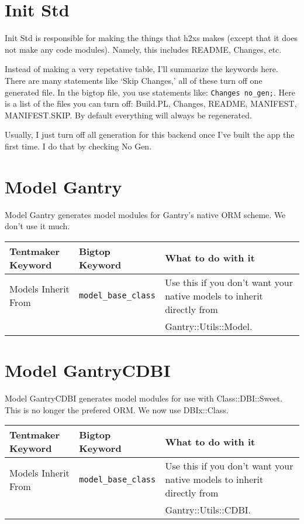 \section{Init Std}

Init Std is responsible for making the things that h2xs makes (except that
it does not make any code modules).  Namely, this includes README, Changes,
etc.

Instead of making a very repetative table, I'll summarize the keywords here.
There are many statements like `Skip Changes,' all of these turn off
one generated file.  In the bigtop file, you use statements like:
\verb+Changes no_gen;+.  Here is a list of the files you can turn off:
Build.PL, Changes, README, MANIFEST, MANIFEST.SKIP.  By default everything
will always be regenerated.

Usually, I just turn off all generation for this backend once I've built
the app the first time.  I do that by checking No Gen.

\section{Model Gantry}

Model Gantry generates model modules for Gantry's native ORM scheme.
We don't use it much.

\begin{tabular}{l|l|l}
Tentmaker Keyword & Bigtop Keyword & What to do with it \\
\hline
Models Inherit From & \verb+model_base_class+ &
    Use this if you don't want your native models to inherit directly from \\
& & Gantry::Utils::Model.
\end{tabular}

\section{Model GantryCDBI}

Model GantryCDBI generates model modules for use with Class::DBI::Sweet.
This is no longer the prefered ORM.  We now use DBIx::Class.

\begin{tabular}{l|l|l}
Tentmaker Keyword & Bigtop Keyword & What to do with it \\
\hline
Models Inherit From & \verb+model_base_class+ &
    Use this if you don't want your native models to inherit directly from \\
& & Gantry::Utils::CDBI.
\end{tabular}

